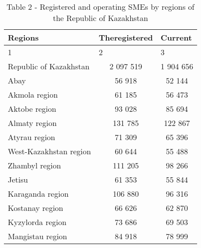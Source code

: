 \begin{table}[H]
\caption*{Table 2 - Registered and operating SMEs by regions of the Republic of Kazakhstan}
\centering
\begin{tabular}{|lcc|}
\hline
\multicolumn{1}{|l|}{Regions}                 & \multicolumn{1}{l|}{Theregistered} & \multicolumn{1}{l|}{Current} \\ \hline
\multicolumn{1}{|l|}{1}                       & \multicolumn{1}{l|}{2}             & \multicolumn{1}{l|}{3}       \\ \hline
\multicolumn{1}{|l|}{Republic of Kazakhstan}  & \multicolumn{1}{c|}{2 097 519}     & 1 904 656                    \\ \hline
\multicolumn{1}{|l|}{Abay}                    & \multicolumn{1}{c|}{56 918}        & 52 144                       \\ \hline
\multicolumn{1}{|l|}{Akmola region}           & \multicolumn{1}{c|}{61 185}        & 56 473                       \\ \hline
\multicolumn{1}{|l|}{Aktobe region}           & \multicolumn{1}{c|}{93 028}        & 85 694                       \\ \hline
\multicolumn{1}{|l|}{Almaty region}           & \multicolumn{1}{c|}{131 785}       & 122 867                      \\ \hline
\multicolumn{1}{|l|}{Atyrau region}           & \multicolumn{1}{c|}{71 309}        & 65 396                       \\ \hline
\multicolumn{1}{|l|}{West-Kazakhstan region}  & \multicolumn{1}{c|}{60 644}        & 55 488                       \\ \hline
\multicolumn{1}{|l|}{Zhambyl region}          & \multicolumn{1}{c|}{111 205}       & 98 266                       \\ \hline
\multicolumn{1}{|l|}{Jetisu}                  & \multicolumn{1}{c|}{61 353}        & 55 844                       \\ \hline
\multicolumn{1}{|l|}{Karaganda region}        & \multicolumn{1}{c|}{106 880}       & 96 316                       \\ \hline
\multicolumn{1}{|l|}{Kostanay region}         & \multicolumn{1}{c|}{66 626}        & 62 870                       \\ \hline
\multicolumn{1}{|l|}{Kyzylorda region}        & \multicolumn{1}{c|}{73 686}        & 69 503                       \\ \hline
\multicolumn{1}{|l|}{Mangistau region}        & \multicolumn{1}{c|}{84 918}        & 78 999                       \\ \hline

\end{tabular}
\end{table}
